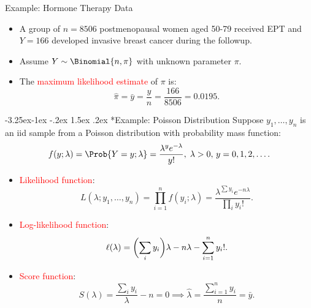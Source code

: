 \documentclass[final]{article}\usepackage[]{graphicx}\usepackage[svgnames]{xcolor}
\makeatletter
\renewcommand\subsection{\@startsection{subsection}{2}{\z@}%
                                     {-3.25ex\@plus -1ex \@minus -.2ex}%
                                     {1.5ex \@plus .2ex}%
                                     {\normalfont\large\bfseries\scshape\color{Blue}}}
\let\log\relax%
\makeatother
\begin{document}
\begin{Example}{Example: Hormone Therapy Data}
      \begin{itemize}
            \item A group of $ n=8506 $ postmenopausal women aged 50-79 received EPT and $ Y=166 $
                  developed invasive breast cancer during the followup.
            \item Assume $ Y \sim \Binomial{n,\pi} $ with unknown parameter $ \pi $.
            \item The \textcolor{Red}{maximum likelihood estimate} of $ \pi $ is:
                  \[ \hat{\pi}=\bar{y}=\frac{y}{n} =\frac{166}{8506}=0.0195. \]
      \end{itemize}
\end{Example}
\subsection*{Example: Poisson Distribution}
Suppose $ y_1,\ldots,y_n $ is an iid sample from a Poisson distribution with probability mass function:
\[ f(y;\lambda)=\Prob{Y=y;\lambda}=\frac{\lambda^y e^{-\lambda}}{y!},\; \lambda>0,\,y=0,1,2,\ldots.  \]
\begin{itemize}
      \item \textcolor{Red}{Likelihood function}:
            \[ L(\lambda;y_1,\ldots,y_n)=\prod_{i=1}^n f(y_i;\lambda)=\frac{\lambda^{\sum y_i}e^{-n\lambda}}{\prod_i y_i!}.  \]
      \item \textcolor{Red}{Log-likelihood function}:
            \[ \ell(\lambda)=\biggl(\sum_i y_i\biggr)\log{\lambda}-n\lambda-\sum_{i=1}^{n} \log{y_i!}. \]
      \item \textcolor{Red}{Score function}:
            \[ S(\lambda)=\frac{\sum_i y_i}{\lambda}-n=0\implies \hat{\lambda}=\frac{\sum_{i=1}^{n} y_i}{n} =\bar{y}.  \]
\end{itemize}
\end{document}

